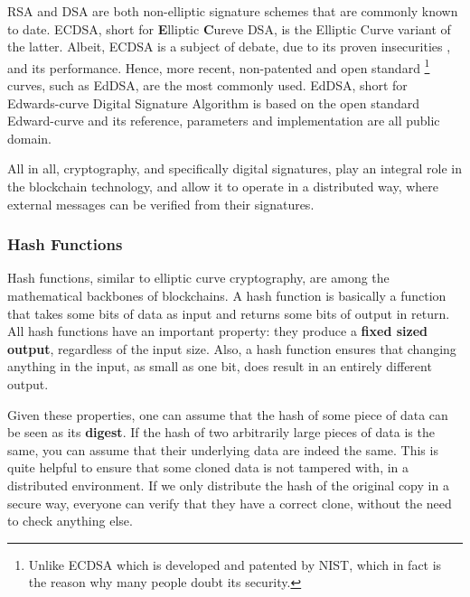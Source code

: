 RSA and DSA are both non-elliptic signature schemes that are commonly known to date. ECDSA, short
for \textbf{E}lliptic \textbf{C}ureve DSA, is the Elliptic Curve variant of the latter. Albeit,
ECDSA is a subject of debate, due to its proven insecurities
\cite{brumleyRemoteTimingAttacks2011}, and its performance. Hence, more recent,
non-patented and open standard \footnote{Unlike ECDSA which is developed and patented by NIST, which
in fact is the reason why many people doubt its security.} curves, such as EdDSA, are the most
commonly used. EdDSA, short for Edwards-curve Digital Signature Algorithm is based on the open
standard Edward-curve and its reference, parameters and implementation are all public domain.

All in all, cryptography, and specifically digital signatures, play an integral role in the
blockchain technology, and allow it to operate in a distributed way, where external messages can be
verified from their signatures.

\subsubsection{Hash Functions} \label{chap_bg:subsec:hash}

Hash functions, similar to elliptic curve cryptography, are among the mathematical backbones of
blockchains. A hash function is basically a function that takes some bits of data as input and
returns some bits of output in return. All hash functions have an important property: they
produce a \textbf{fixed sized output}, regardless of the input size. Also, a hash function ensures
that changing anything in the input, as small as one bit, does result in an entirely different
output.

Given these properties, one can assume that the hash of some piece of data can be seen as its
\textbf{digest}. If the hash of two arbitrarily large pieces of data is the same, you can assume
that their underlying data are indeed the same. This is quite helpful to ensure that some cloned
data is not tampered with, in a distributed environment. If we only distribute the hash of the
original copy in a secure way, everyone can verify that they have a correct clone, without the need
to check anything else.

